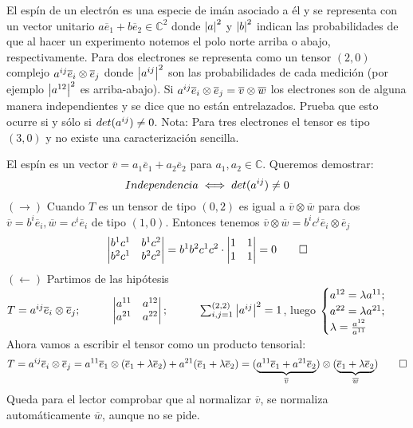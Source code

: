 \begin{problem}[9] El espín de un electrón es una especie de imán asociado a él y se representa con un vector unitario $a\overline{e}_1+b\overline{e}_2\in\mathbb{C}^2$ donde $\abs{a}^2$ y $\abs{b}^2$ indican las probabilidades de que al hacer un experimento notemos el polo norte arriba o abajo, respectivamente. Para dos electrones se representa como un tensor $(2,0)$ complejo $a^{i\space j}\overline{e}_i\otimes\overline{e}_j$ donde $\abs{a^{i\space j}}^2$ son las probabilidades de cada medición (por ejemplo $\abs{a^{1\space 2}}^2$ es arriba-abajo). Si $a^{i\space j}\overline{e}_i\otimes\overline{e}_j=\overline{v}\otimes\overline{w}$ los electrones son de alguna manera independientes y se dice que no están entrelazados. Prueba que esto ocurre si y sólo si $det(a^{i\space j})\neq0$. Nota: Para tres electrones el tensor es tipo $(3,0)$ y no existe una caracterización sencilla.
	
	\solution El espín es un vector $\overline{v}=a_1\overline{e}_1+a_2\overline{e}_2$ para $a_1,a_2\in\mathbb{C}$. Queremos demostrar:$$Independencia\iff det(a^{i\space j})\neq0$$
	$(\rightarrow)$ Cuando $T$ es un tensor de tipo $(0,2)$ es igual a $\overline{v}\otimes\overline{w}$ para dos $\overline{v}=b^i\overline{e}_i,\overline{w}=c^i\overline{e}_i$ de tipo $(1,0)$. Entonces tenemos $\overline{v}\otimes\overline{w}=b^ic^i\overline{e}_i\otimes\overline{e}_j$
	$$\begin{vmatrix}
	b^1c^1&b^1c^2\\
	b^2c^1&b^2c^2
	\end{vmatrix}=b^1b^2c^1c^2\cdot\begin{vmatrix}
	1&1\\
	1&1
	\end{vmatrix}=0\qed$$
	$(\leftarrow)$ Partimos de las hipótesis $T=a^{i\space j}\overline{e}_i\otimes\overline{e}_j;\hspace*{1cm}\begin{vmatrix}
	a^{1\space1}&a^{1\space2}\\
	a^{2\space1}&a^{2\space2}
	\end{vmatrix};\hspace*{1cm}\sum_{i,j=1}^{(2,2)}\abs{a^{i\space j}}^2=1$, luego $\begin{cases}
	a^{1\space 2}=\lambda a^{1\space 1};\\
	a^{2\space 2}=\lambda a^{2\space 1};\\
	\lambda=\frac{a^{1\space 2}}{a^{1\space 1}}
	\end{cases}$ Ahora vamos a escribir el tensor como un producto tensorial:
	$$T=a^{i\space j}\overline{e}_i\otimes\overline{e}_j=a^{1\space 1}\overline{e}_1\otimes(\overline{e}_1+\lambda\overline{e}_2)+a^{2\space 1}(\overline{e}_1+\lambda\overline{e}_2)=(\underbrace{a^{1\space 1}\overline{e}_1+a^{2\space 1}\overline{e}_2}_{\overline{v}})\otimes(\underbrace{\overline{e}_1+\lambda\overline{e}_2}_{\overline{w}})\qed$$ Queda para el lector comprobar que al normalizar $\overline{v}$, se normaliza automáticamente $\overline{w}$, aunque no se pide.
\end{problem}

